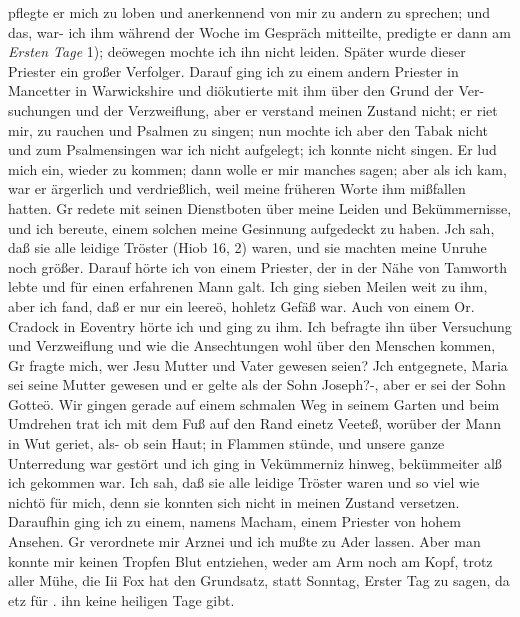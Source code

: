 pflegte er mich zu loben und anerkennend von mir zu andern zu
sprechen; und das, war- ich ihm während der Woche im Gespräch
mitteilte, predigte er dann am \textit{Ersten Tage} 1); deöwegen mochte
ich ihn nicht leiden. Später wurde dieser Priester ein großer
Verfolger.
Darauf ging ich zu einem andern Priester in Mancetter in
Warwickshire und diökutierte mit ihm über den Grund der Ver-
suchungen und der Verzweiflung, aber er verstand meinen Zustand
nicht; er riet mir, zu rauchen und Psalmen zu singen; nun mochte
ich aber den Tabak nicht und zum Psalmensingen war ich nicht
aufgelegt; ich konnte nicht singen. Er lud mich ein, wieder zu
kommen; dann wolle er mir manches sagen; aber als ich kam,
war er ärgerlich und verdrießlich, weil meine früheren Worte ihm
mißfallen hatten. Gr redete mit seinen Dienstboten über meine
Leiden und Bekümmernisse, und ich bereute, einem solchen meine
Gesinnung aufgedeckt zu haben. Jch sah, daß sie alle leidige
Tröster (Hiob 16, 2) waren, und sie machten meine Unruhe noch
größer. Darauf hörte ich von einem Priester, der in der Nähe
von Tamworth lebte und für einen erfahrenen Mann galt. Ich
ging sieben Meilen weit zu ihm, aber ich fand, daß er nur ein
leereö, hohletz Gefäß war. Auch von einem Or. Cradock in Eoventry
hörte ich und ging zu ihm. Ich befragte ihn über Versuchung
und Verzweiflung und wie die Ansechtungen wohl über den
Menschen kommen, Gr fragte mich, wer Jesu Mutter und Vater
gewesen seien? Jch entgegnete, Maria sei seine Mutter gewesen
und er gelte als der Sohn Joseph?-, aber er sei der Sohn Gotteö.
Wir gingen gerade auf einem schmalen Weg in seinem Garten
und beim Umdrehen trat ich mit dem Fuß auf den Rand einetz
Veeteß, worüber der Mann in Wut geriet, als- ob sein Haut; in
Flammen stünde, und unsere ganze Unterredung war gestört und
ich ging in Vekümmerniz hinweg, bekümmeiter alß ich gekommen
war. Ich sah, daß sie alle leidige Tröster waren und so viel
wie nichtö für mich, denn sie konnten sich nicht in meinen Zustand
versetzen. Daraufhin ging ich zu einem, namens Macham, einem
Priester von hohem Ansehen. Gr verordnete mir Arznei und ich
mußte zu Ader lassen. Aber man konnte mir keinen Tropfen Blut
entziehen, weder am Arm noch am Kopf, trotz aller Mühe, die
Iii Fox hat den Grundsatz, statt Sonntag, Erster Tag zu sagen, da etz für
. ihn keine heiligen Tage gibt.



